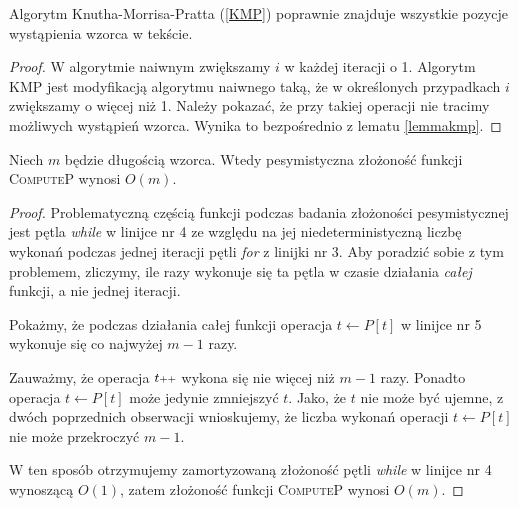 \begin{theorem}
	Algorytm Knutha-Morrisa-Pratta (\ref{KMP}) poprawnie znajduje wszystkie pozycje wystąpienia wzorca w tekście. 
	\begin{proof}
		W algorytmie naiwnym zwiększamy $i$ w każdej iteracji o 1. Algorytm KMP jest modyfikacją algorytmu naiwnego taką, że w określonych przypadkach $i$ zwiększamy o więcej niż 1. Należy pokazać, że przy takiej operacji nie tracimy możliwych wystąpień wzorca. Wynika to bezpośrednio z lematu \ref{lemmakmp}.
	\end{proof}
\end{theorem}

\begin{lemma}
	\label{lemma:zlozonoscComputeP}
	Niech $m$ będzie długością wzorca. Wtedy pesymistyczna złożoność funkcji \textsc{ComputeP} wynosi $O(m)$.
	\begin{proof}
		Problematyczną częścią funkcji podczas badania złożoności pesymistycznej jest pętla \textit{while} w linijce nr 4 
		ze względu na jej niedeterministyczną liczbę wykonań podczas jednej iteracji pętli \textit{for} z linijki nr 3. Aby poradzić sobie z tym problemem, zliczymy, ile razy wykonuje się ta pętla
		w czasie działania \textit{całej} funkcji, a nie jednej iteracji.
		 
		Pokażmy, że podczas działania całej funkcji operacja $t \gets P[t]$ w linijce nr 5 wykonuje się co najwyżej $m-1$ razy.
		
		Zauważmy, że operacja $t\scalebox{0.75}{++}$ wykona się nie więcej niż $m-1$ razy.
		Ponadto operacja $t \gets P[t]$ może jedynie zmniejszyć $t$. Jako, że $t$ nie może
		być ujemne, z dwóch poprzednich obserwacji wnioskujemy, że
		liczba wykonań operacji $t \gets P[t]$ nie może przekroczyć $m-1$.
		
		W ten sposób otrzymujemy zamortyzowaną złożoność pętli \textit{while} w linijce nr 4
		wynoszącą $O(1)$, zatem złożoność funkcji \textsc{ComputeP} wynosi $O(m)$.
		
	\end{proof}	
\end{lemma}


